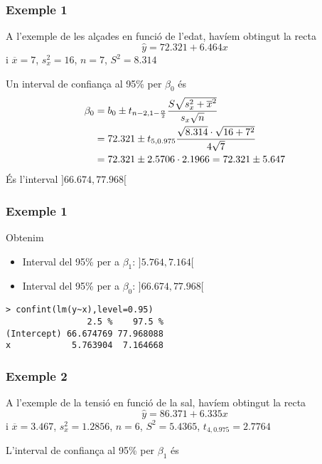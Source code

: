\documentclass[12pt,t]{beamer}
\theoremstyle{plain}
\theoremstyle{definition}
\begin{document}
\begin{frame}
\frametitle{Exemple 1}
\vspace*{-2ex}

A l'exemple de les alçades en funció de l'edat, havíem obtingut la recta
$$
\widehat{y}=72.321+6.464x
$$
i $\overline{x}=7$, $s_x^2=16$, $n=7$, $S^2=8.314$
\medskip

Un interval de confiança al 95\% per $\beta_0$ és
$$
\begin{array}{l}
\displaystyle \beta_0=b_0\pm t_{n-2,1-\frac{\alpha}{2}}\frac{S\sqrt{s_x^2+\overline{x}^2}}{s_x\sqrt{n}}
\\[2ex]
\displaystyle\hphantom{\beta_0}=72.321\pm t_{5,0.975} \frac{\sqrt{8.314}\cdot\sqrt{16+7^2}}{4\sqrt{7}}\\[2ex]
\hphantom{\beta_0} =
72.321\pm 2.5706 \cdot 2.1966=72.321\pm 5.647
\end{array}
$$
És l'interval $]66.674,77.968[$

\end{frame}






\begin{frame}[fragile]
\frametitle{Exemple 1}
\vspace*{-2ex}

Obtenim
\begin{itemize}
\item Interval del 95\% per a $\beta_1$: $]5.764,7.164[$
\medskip

\item Interval del 95\% per a $\beta_0$: $]66.674,77.968[$
\end{itemize}
\begin{verbatim}
> confint(lm(y~x),level=0.95)
                2.5 %    97.5 %
(Intercept) 66.674769 77.968088
x            5.763904  7.164668
\end{verbatim}

\end{frame}



\begin{frame}
\frametitle{Exemple 2}


A l'exemple de la tensió en funció de la sal, havíem obtingut la recta
$$
\widehat{y}=86.371+6.335x
$$
i $\overline{x}=3.467$, $s_x^2=1.2856$, $n=6$, $S^2=5.4365$, $t_{4,0.975}=2.7764$
\medskip

L'interval de confiança al 95\% per $\beta_1$ és
\end{frame}
\end{document}
